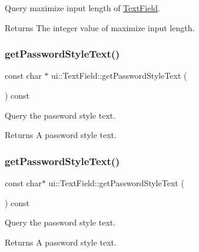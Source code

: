 Query maximize input length of \hyperlink{classui_1_1TextField}{Text\+Field}. 

\begin{DoxyReturn}{Returns}
The integer value of maximize input length. 
\end{DoxyReturn}
\mbox{\label{classui_1_1TextField_a3b875db0a0ed2e099a1f6ead951470ed}} 
\subsubsection{\texorpdfstring{get\+Password\+Style\+Text()}{getPasswordStyleText()}\hspace{0.1cm}{\footnotesize\ttfamily [1/2]}}
{\footnotesize\ttfamily const char $\ast$ ui\+::\+Text\+Field\+::get\+Password\+Style\+Text (\begin{DoxyParamCaption}{ }\end{DoxyParamCaption}) const}



Query the password style text. 

\begin{DoxyReturn}{Returns}
A password style text. 
\end{DoxyReturn}
\mbox{\label{classui_1_1TextField_aed4a24fd558b1592c22899ae89d2ef34}} 
\subsubsection{\texorpdfstring{get\+Password\+Style\+Text()}{getPasswordStyleText()}\hspace{0.1cm}{\footnotesize\ttfamily [2/2]}}
{\footnotesize\ttfamily const char$\ast$ ui\+::\+Text\+Field\+::get\+Password\+Style\+Text (\begin{DoxyParamCaption}{ }\end{DoxyParamCaption}) const}



Query the password style text. 

\begin{DoxyReturn}{Returns}
A password style text. 
\end{DoxyReturn}
\mbox{\label{classui_1_1TextField_ade85e9d25d7f7aee1aa656d1ea1b7990}} 
